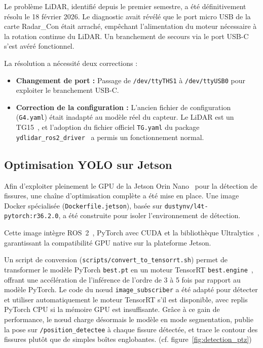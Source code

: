 \documentclass[12pt,a4paper]{article}
\begin{document}
Le problème LiDAR, identifié depuis le premier semestre, a été définitivement résolu le 18 février 2026. Le diagnostic avait révélé que le port micro USB de la carte Radar\_Con était arraché, empêchant l'alimentation du moteur nécessaire à la rotation continue du LiDAR. Un branchement de secours via le port USB-C s'est avéré fonctionnel.

La résolution a nécessité deux corrections :
\begin{itemize}
    \item \textbf{Changement de port :} Passage de \texttt{/dev/ttyTHS1} à \texttt{/dev/ttyUSB0} pour exploiter le branchement USB-C.
    \item \textbf{Correction de la configuration :} L'ancien fichier de configuration (\texttt{G4.yaml}) était inadapté au modèle réel du capteur. Le LiDAR est un TG15~\cite{ydlidar_tg15}, et l'adoption du fichier officiel \texttt{TG.yaml} du package \texttt{ydlidar\_ros2\_driver}~\cite{ydlidar_ros2_driver} a permis un fonctionnement normal.
\end{itemize}

\subsection{Optimisation YOLO sur Jetson}

Afin d'exploiter pleinement le GPU de la Jetson Orin Nano~\cite{jetson_orin} pour la détection de fissures, une chaîne d'optimisation complète a été mise en place. Une image Docker spécialisée (\texttt{Dockerfile.jetson}), basée sur \texttt{dustynv/l4t-pytorch:r36.2.0}, a été construite pour isoler l'environnement de détection.

Cette image intègre ROS~2~\cite{ros2}, PyTorch avec CUDA et la bibliothèque Ultralytics~\cite{ultralytics_yolo}, garantissant la compatibilité GPU native sur la plateforme Jetson.

Un script de conversion (\texttt{scripts/convert\_to\_tensorrt.sh}) permet de transformer le modèle PyTorch \texttt{best.pt} en un moteur TensorRT \texttt{best.engine}~\cite{tensorrt}, offrant une accélération de l'inférence de l'ordre de 3 à 5 fois par rapport au modèle PyTorch. Le code du nœud \texttt{image\_subscriber} a été adapté pour détecter et utiliser automatiquement le moteur TensorRT s'il est disponible, avec replis PyTorch CPU si la mémoire GPU est insuffisante. Grâce à ce gain de performance, le nœud charge désormais le modèle en mode segmentation, publie la pose sur \texttt{/position\_detectee} à chaque fissure détectée, et trace le contour des fissures plutôt que de simples boîtes englobantes. (cf. figure~\ref{fig:detection_ptz})
\end{document}
